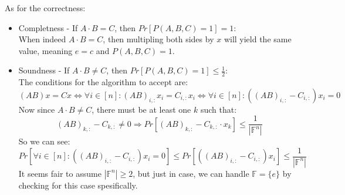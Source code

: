 \documentclass{article}
\begin{document}
As for the correctness:
\begin{itemize}
    \item Completness - If $A\cdot B = C$, then $Pr[P(A,B,C)=1]=1$:\\
    When indeed $A\cdot B=C$, then multipling both sides by $x$
    will yield the same value, meaning $e=c$ and $P(A,B,C)=1$.\\
    \item Soundness - If $A\cdot B \neq C$, then $Pr[P(A,B,C)=1]\leq \frac{1}{2}$:\\
    The conditions for the algorithm to accept are:
    \[
        (AB)x=Cx
        \Leftrightarrow \forall i\in[n]: (AB)_{i,:}x_i=C_{i,:}x_i
        \Leftrightarrow \forall i\in[n]: ((AB)_{i,:}-C_{i,:})x_i=0
    \]
    Now since $A\cdot B\neq C$, there must be at least one $k$ such that:
    \[
        (AB)_{k,:}-C_{k,:}\neq 0
        \Rightarrow Pr[(AB)_{k,:}-C_{k,:}\cdot x_k]\leq \frac{1}{|\mathbb{F}^n|}
    \]
    So we can see:
    \[
        Pr[\forall i\in[n]: ((AB)_{i,:}-C_{i,:})x_i=0] \leq
        Pr[((AB)_{i,:}-C_{i,:})x_i]\leq \frac{1}{|\mathbb{F}^n|}
    \]
    It seems fair to assume $|\mathbb{F}^n|\geq 2$, but just in case,
    we can handle $\mathbb{F}=\{e\}$ by checking for this case spesifically.
\end{itemize}
\end{document}
